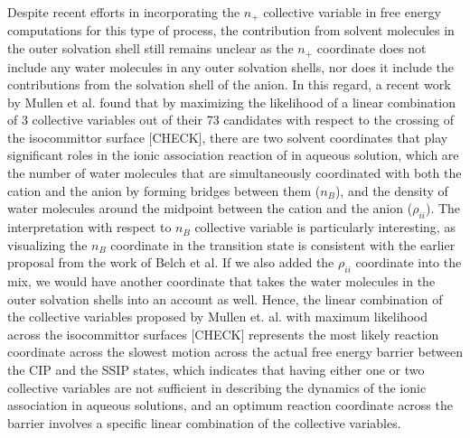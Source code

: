 \begin{spacing}{2.0}
    Despite recent efforts in incorporating the $n_+$ collective variable in free energy computations for this type of process, the contribution 
    from solvent molecules in the outer solvation shell still remains unclear as the $n_+$ coordinate does not include any water molecules in any 
    outer solvation shells, nor does it include the contributions from the solvation shell of the anion. In this regard, a recent work by 
    Mullen et al. found that by maximizing the likelihood of a linear combination of 3 collective variables out of their 73 candidates with respect 
    to the crossing of the isocommittor surface [CHECK], there are two solvent coordinates that play significant roles in the ionic association 
    reaction of  in aqueous solution, which are the number of water molecules that are simultaneously coordinated with both the cation 
    and the anion by forming bridges between them ($n_B$), and the density of water molecules around the midpoint between the cation and the anion
    ($\rho_{ii}$). \cite{P-JCTC-2014-v10-Mullen} The interpretation with respect to $n_B$ collective variable is particularly interesting, as visualizing 
    the $n_B$ coordinate in the transition state is consistent with the earlier proposal from the work of Belch et al. \cite{P-JACS-1986-v108-Belch}
    If we also added the $\rho_{ii}$ coordinate into the mix, we would have another coordinate that takes the water molecules in the outer solvation 
    shells into an account as well. Hence, the linear combination of the collective variables proposed by Mullen et. al. with maximum likelihood 
    across the isocommittor surfaces [CHECK] represents the most likely reaction coordinate across the slowest motion across the actual free energy 
    barrier between the CIP and the SSIP states, which indicates that having either one or two collective variables are not sufficient in describing 
    the dynamics of the ionic association in aqueous solutions, and an optimum reaction coordinate across the barrier involves a specific linear 
    combination of the collective variables.

\end{spacing}
